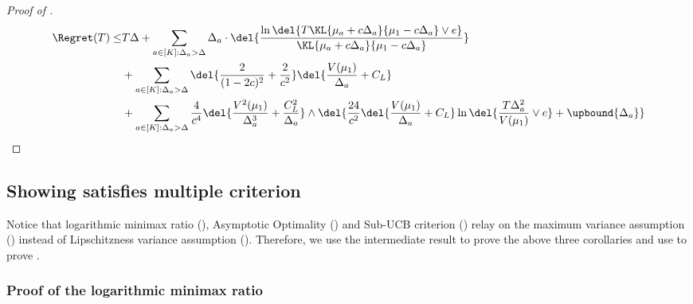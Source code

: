 \begin{proof}[Proof of ]
    \begin{align*}
        \Regret(T) 
        \leq&
        T\Delta + \sum_{a\in[K]:\Delta_a > \Delta} \Delta_a \cdot \del{\frac{\ln\del{T\KL{\mu_a+c\Delta_a}{\mu_1-c\Delta_a} \vee e}}{\KL{\mu_a+c\Delta_a}{\mu_1-c\Delta_a}}}
        \\
        &+
        \sum_{a\in[K]:\Delta_a > \Delta} \del{\frac{2}{(1-2c)^2} + \frac{2}{c^2}} \del{\frac{V(\mu_1)}{\Delta_a} + C_L}
        \\
        &+
        \sum_{a\in[K]:\Delta_a > \Delta}  \frac{4}{c^4} \del{\frac{V^2(\mu_1)}{\Delta_a^3} + \frac{C_L^2}{\Delta_a}}  \wedge \del{ \frac{24}{c^2} \del{\frac{V(\mu_1)}{\Delta_a} + C_L} \ln\del{\frac{T\Delta_a^2}{V(\mu_1)} \vee e} + \upbound{\Delta_a}}
    \end{align*}
\end{proof}

\subsection{Showing \expklms satisfies multiple criterion}
Notice that logarithmic minimax ratio (), Asymptotic Optimality () and Sub-UCB criterion () relay on the maximum variance assumption () instead of Lipschitzness variance assumption (). Therefore, we use the intermediate result  to prove the above three corollaries and use  to prove .
\subsubsection{Proof of the logarithmic minimax ratio}

